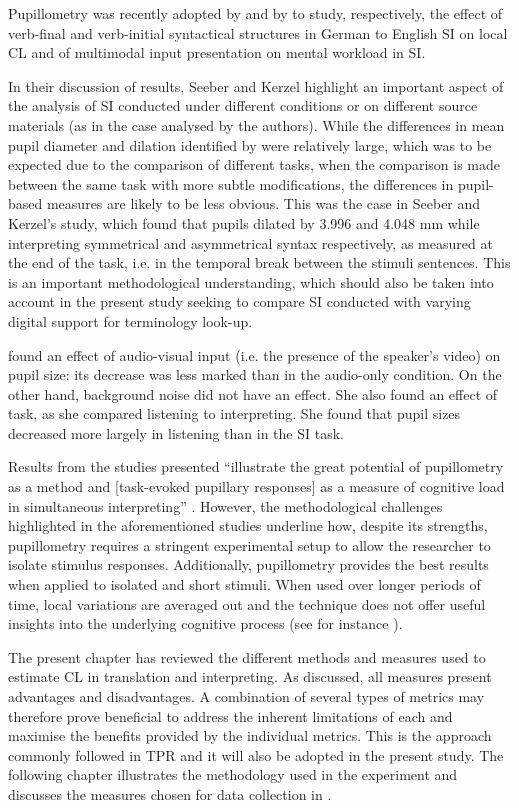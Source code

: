 Pupillometry was recently adopted by \citet{seeber_cognitive_2012} and by \citet{gieshoff_impact_2018} to study, respectively, the effect of verb-final and verb-initial syntactical structures in German to English SI on local CL and of multimodal input presentation on mental workload in SI.

In their discussion of results, Seeber and Kerzel highlight an important aspect of the analysis of SI conducted under different conditions or on different source materials (as in the case analysed by the authors). While the differences in mean pupil diameter and dilation identified by \citet{hyona_pupil_1995} were relatively large, which was to be expected due to the comparison of different tasks, when the comparison is made between the same task with more subtle modifications, the differences in pupil-based measures are likely to be less obvious. This was the case in Seeber and Kerzel's study, which found that pupils dilated by 3.996 and 4.048 mm while interpreting symmetrical and asymmetrical syntax respectively, as measured at the end of the task, i.e. in the temporal break between the stimuli sentences. This is an important methodological understanding, which should also be taken into account in the present study seeking to compare SI conducted with varying digital support for terminology look-up.

\citet{gieshoff_impact_2018} found an effect of audio-visual input (i.e. the presence of the speaker's video) on pupil size: its decrease was less marked than in the audio-only condition. On the other hand, background noise did not have an effect. She also found an effect of task, as she compared listening to interpreting. She found that pupil sizes decreased more largely in listening than in the SI task.

Results from the studies presented ``illustrate the great potential of pupillometry as a method and [task-evoked pupillary responses] as a measure of cognitive load in simultaneous interpreting'' \citep[27]{seeber_cognitive_2013}. However, the methodological challenges highlighted in the aforementioned studies underline how, despite its strengths, pupillometry requires a stringent experimental setup to allow the researcher to isolate stimulus responses. Additionally, pupillometry provides the best results when applied to isolated and short stimuli. When used over longer periods of time, local variations are averaged out and the technique does not offer useful insights into the underlying cognitive process (see for instance \citealt{schultheis_assessing_2004}).

The present chapter has reviewed the different methods and measures used to estimate CL in translation and interpreting. As discussed, all measures present advantages and disadvantages. A combination of several types of metrics may therefore prove beneficial to address the inherent limitations of each and maximise the benefits provided by the individual metrics. This is the approach commonly followed in TPR and it will also be adopted in the present study. The following chapter illustrates the methodology used in the experiment and discusses the measures chosen for data collection in .
